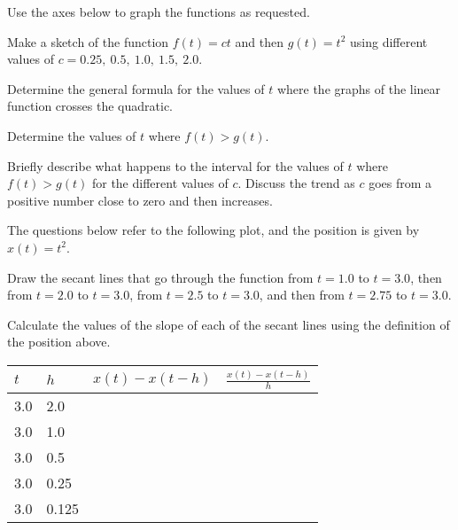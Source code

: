 \begin{problem}
\item Use the axes below to graph the functions as requested.

  \scalebox{0.7}{}

  \begin{subproblem}
  \item Make a sketch of the function $f(t)=c t$ and then $g(t)=t^2$
    using different values of $c=0.25,~0.5,~1.0,~1.5,~2.0$.
  \item Determine the general formula for the values of $t$
    where the graphs of the linear function crosses the quadratic.
    \vfill
  \item Determine the values of $t$ where $f(t)>g(t)$.
    \vfill
    \clearpage
  \item Briefly describe what happens to the interval for the
    values of $t$ where $f(t)>g(t)$
    for the different values of
    $c$. Discuss the trend as $c$ goes from a positive number close to
    zero and then increases.
    \vfill
  \end{subproblem}

  \clearpage

\item The questions below refer to the following plot, and the
  position is given by $x(t)=t^2$.
  \label{activity:3:graph}

  \scalebox{0.7}{}

  \begin{subproblem}
    \item Draw the secant lines that go through the function from
      $t=1.0$ to $t=3.0$, then from $t=2.0$ to $t=3.0$, from
      $t=2.5$ to $t=3.0$, and then from $t=2.75$ to $t=3.0$.
    \item Calculate the values of the slope of each of the secant
      lines using the definition of the position above.

      \begin{tabular}{l|l|l|l}
        $t$ & $h$   & $x(t)-x(t-h)$ & $\frac{x(t)-x(t-h)}{h}$ \\ \hline
        3.0 & 2.0   & & \\ [15pt]
        3.0 & 1.0   & & \\ [15pt]
        3.0 & 0.5   & & \\ [15pt]
        3.0 & 0.25  & & \\ [15pt]
        3.0 & 0.125 & & \\ [15pt]
      \end{tabular}


\end{subproblem}
\end{problem}
